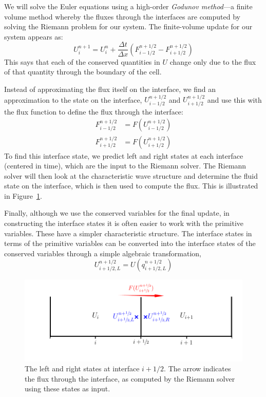 \label{sec:onedrecon}

We will solve the Euler equations using a high-order {\em Godunov
  method}---a finite volume method whereby the fluxes through the
interfaces are computed by solving the Riemann problem for our system.
The finite-volume update for our system appears as:
\begin{equation}
U^{n+1}_i = U^n_i + \frac{\Delta t}{\Delta x} \left ( F_{i-1/2}^{n+1/2} - F_{i+1/2}^{n+1/2} \right )
\end{equation}
This says that each of the conserved quantities in $U$ change only due
to the flux of that quantity through the boundary of the cell.

Instead of approximating the flux itself on the interface, we find an
approximation to the state on the interface, $U_{i-1/2}^{n+1/2}$ and
$U_{i+1/2}^{n+1/2}$ and use this with the flux function to define the
flux through the interface:
\begin{align}
F_{i-1/2}^{n+1/2} &= F(U_{i-1/2}^{n+1/2}) \\
F_{i+1/2}^{n+1/2} &= F(U_{i+1/2}^{n+1/2})
\end{align}
To find this interface state, we predict left and right states at each
interface (centered in time), which are the input to the Riemann
solver.  The Riemann solver will then look at the characteristic wave
structure and determine the fluid state on the interface, which is
then used to compute the flux.  This is illustrated in
Figure~\ref{fig:riemann}.  

Finally, although we use the conserved variables for the final update,
in constructing the interface states it is often easier to work with
the primitive variables.  These have a simpler characteristic
structure.  The interface states in terms of the primitive variables
can be converted into the interface states of the conserved variables
through a simple algebraic transformation, 
\begin{equation}
U_{i+1/2,L}^{n+1/2} = U(q_{i+1/2,L}^{n+1/2})
\end{equation}

\begin{figure}[t]
\centering
\includegraphics[width=\linewidth]{riemann_comp}
\caption[The left and right states for the Riemann
  problem.]{\label{fig:riemann} The left and right states at interface
  $i+1/2$.  The arrow indicates the flux through the interface, as
  computed by the Riemann solver using these states as input.}
\end{figure}

